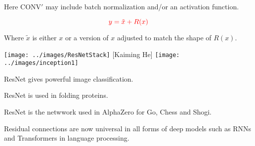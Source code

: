 {\vfill
Here $\mathrm{CONV}'$ may include batch normalization and/or an activation function.


$${\color{red} y = \tilde{x} + R(x)}$$

\vfill
Where $\tilde{x}$ is either $x$ or a version of $x$ adjusted to match the shape of $R(x)$.



\centerline{\texttt{[image: ../images/ResNetStack]} {\large [Kaiming He]} \texttt{[image: ../images/inception1]}}


ResNet gives powerful image classification.

\vfill
ResNet is used in folding proteins.

\vfill
ResNet is the netwwork used in AlphaZero for Go, Chess and Shogi.

\vfill
Residual connections are now universal in all forms of deep models such as RNNs and Transformers in language processing.


}

